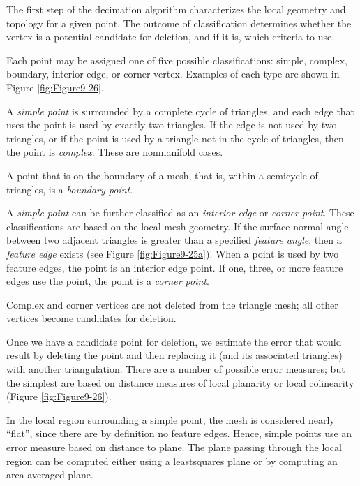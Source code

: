 \begin{description}[leftmargin=0cm,labelindent=0cm]

\item[Point Classification.] The first step of the decimation algorithm characterizes the local geometry and topology for a given point. The outcome of classification determines whether the vertex is a potential candidate for deletion, and if it is, which criteria to use.

Each point may be assigned one of five possible classifications: simple, complex, boundary, interior edge, or corner vertex. Examples of each type are shown in Figure \ref{fig:Figure9-26}.

A \emph{simple point} is surrounded by a complete cycle of triangles, and each edge that uses the point is used by exactly two triangles. If the edge is not used by two triangles, or if the point is used by a triangle not in the cycle of triangles, then the point is \emph{complex}. These are nonmanifold cases.

A point that is on the boundary of a mesh, that is, within a semicycle of triangles, is a \emph{boundary point}.

A \emph{simple point} can be further classified as an \emph{interior edge} or \emph{corner point}. These classifications are based on the local mesh geometry. If the surface normal angle between two adjacent triangles is greater than a specified \emph{feature angle}, then a \emph{feature edge} exists (see Figure \ref{fig:Figure9-25a}). When a point is used by two feature edges, the point is an interior edge point. If one, three, or more feature edges use the point, the point is a \emph{corner point}.

Complex and corner vertices are not deleted from the triangle mesh; all other vertices become candidates for deletion.

\item[Decimation Criterion.] Once we have a candidate point for deletion, we estimate the error that would result by deleting the point and then replacing it (and its associated triangles) with another triangulation. There are a number of possible error measures; but the simplest are based on distance measures of local planarity or local colinearity (Figure \ref{fig:Figure9-26}).

In the local region surrounding a simple point, the mesh is considered nearly ``flat'', since there are by definition no feature edges. Hence, simple points use an error measure based on distance to plane. The plane passing through the local region can be computed either using a leastsquares plane or by computing an area-averaged plane.


\end{description}
